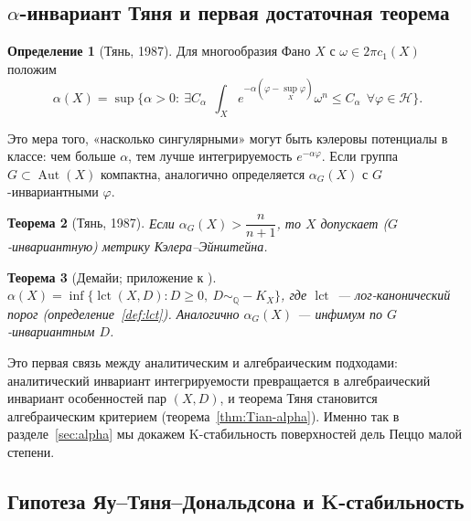 \documentclass[11pt,a4paper]{article}
\theoremstyle{plain}
\newtheorem{theorem}{Теорема}[section]
\theoremstyle{definition}
\newtheorem{definition}[theorem]{Определение}
\theoremstyle{remark}
\newcommand{\Q}{\mathbb{Q}}
\DeclareMathOperator{\Aut}{Aut}
\DeclareMathOperator{\lct}{lct}
\begin{document}
\subsection{\texorpdfstring{$\alpha$}{α}-инвариант Тяня и первая достаточная теорема}

\begin{definition}[Тянь, 1987]\label{def:alpha-analytic}
Для многообразия Фано $X$ с $\omega\in2\pi c_1(X)$ положим
\[
\alpha(X)=\sup\Big\{\alpha>0:\ \exists C_\alpha\ \ \int_Xe^{-\alpha(\varphi-\sup_X\varphi)}\omega^n\le C_\alpha
\ \ \forall\varphi\in\mathcal H\Big\}.
\]
\end{definition}

Это мера того, «насколько сингулярными» могут быть кэлеровы потенциалы в классе: чем больше $\alpha$,
тем лучше интегрируемость $e^{-\alpha\varphi}$. Если группа $G\subset\Aut(X)$ компактна, аналогично
определяется $\alpha_G(X)$ с $G$-инвариантными $\varphi$.

\begin{theorem}[Тянь, 1987]\label{thm:Tian-alpha-analytic}
Если $\alpha_G(X)>\dfrac n{n+1}$, то $X$ допускает \textup{(}$G$-инвариантную\textup{)} метрику Кэлера--Эйнштейна.
\end{theorem}

\begin{theorem}[{Демайи; приложение к \cite{CS08}}]\label{thm:Demailly}
$\alpha(X)=\inf\{\lct(X,D): D\ge0,\ D\sim_\Q-K_X\}$, где $\lct$ --- лог-канонический порог
\textup{(}определение~\ref{def:lct}\textup{)}. Аналогично $\alpha_G(X)$ --- инфимум по $G$-инвариантным $D$.
\end{theorem}

Это первая связь между аналитическим и алгебраическим подходами: аналитический инвариант интегрируемости превращается
в алгебраический инвариант особенностей пар $(X,D)$, и теорема Тяня становится алгебраическим
критерием (теорема~\ref{thm:Tian-alpha}). Именно так в разделе~\ref{sec:alpha} мы докажем
K-стабильность поверхностей дель Пеццо малой степени.

\subsection{Гипотеза Яу--Тяня--Дональдсона и K-стабильность}
\end{document}

